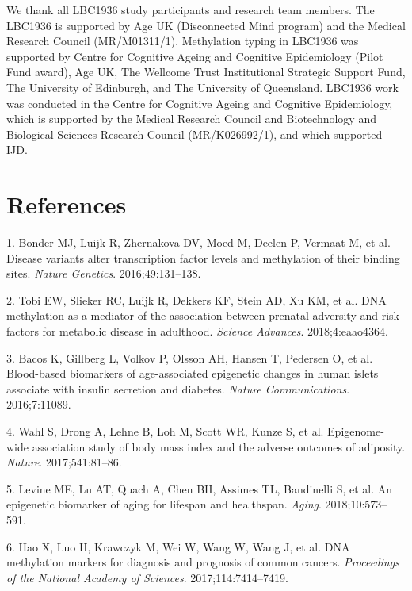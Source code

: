 \documentclass[]{article}
\begin{document}
We thank all LBC1936 study participants and research team members. The
LBC1936 is supported by Age UK (Disconnected Mind program) and the
Medical Research Council (MR/M01311/1). Methylation typing in LBC1936
was supported by Centre for Cognitive Ageing and Cognitive Epidemiology
(Pilot Fund award), Age UK, The Wellcome Trust Institutional Strategic
Support Fund, The University of Edinburgh, and The University of
Queensland. LBC1936 work was conducted in the Centre for Cognitive
Ageing and Cognitive Epidemiology, which is supported by the Medical
Research Council and Biotechnology and Biological Sciences Research
Council (MR/K026992/1), and which supported IJD.

\hypertarget{references}{%
\section{References}\label{references}}

\hypertarget{refs}{}
\leavevmode\hypertarget{ref-Bonder2016}{}%
1. Bonder MJ, Luijk R, Zhernakova DV, Moed M, Deelen P, Vermaat M, et
al. Disease variants alter transcription factor levels and methylation
of their binding sites. \emph{Nature Genetics}. 2016;49:131--138.

\leavevmode\hypertarget{ref-Tobi2018}{}%
2. Tobi EW, Slieker RC, Luijk R, Dekkers KF, Stein AD, Xu KM, et al. DNA
methylation as a mediator of the association between prenatal adversity
and risk factors for metabolic disease in adulthood. \emph{Science
Advances}. 2018;4:eaao4364.

\leavevmode\hypertarget{ref-Bacos2016}{}%
3. Bacos K, Gillberg L, Volkov P, Olsson AH, Hansen T, Pedersen O, et
al. Blood-based biomarkers of age-associated epigenetic changes in human
islets associate with insulin secretion and diabetes. \emph{Nature
Communications}. 2016;7:11089.

\leavevmode\hypertarget{ref-Wahl2017}{}%
4. Wahl S, Drong A, Lehne B, Loh M, Scott WR, Kunze S, et al.
Epigenome-wide association study of body mass index and the adverse
outcomes of adiposity. \emph{Nature}. 2017;541:81--86.

\leavevmode\hypertarget{ref-Levine2018}{}%
5. Levine ME, Lu AT, Quach A, Chen BH, Assimes TL, Bandinelli S, et al.
An epigenetic biomarker of aging for lifespan and healthspan.
\emph{Aging}. 2018;10:573--591.

\leavevmode\hypertarget{ref-Hao2017}{}%
6. Hao X, Luo H, Krawczyk M, Wei W, Wang W, Wang J, et al. DNA
methylation markers for diagnosis and prognosis of common cancers.
\emph{Proceedings of the National Academy of Sciences}.
2017;114:7414--7419.
\end{document}
